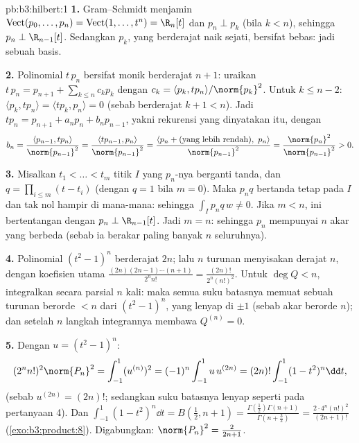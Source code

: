 \begin{solution}{pb:b3:hilbert:1}
\textbf{1.} Gram--Schmidt menjamin
$\operatorname{Vect}(p_0, \dots, p_n) =
\operatorname{Vect}(1, \dots, t^n) = \R_n[t]$ dan $p_n \perp
p_k$ (bila $k < n$), sehingga $p_n \perp \R_{n-1}[t]$. Sedangkan $p_k$, yang
berderajat naik sejati, bersifat bebas: jadi sebuah basis.

\textbf{2.} Polinomial $t\,p_n$ bersifat monik berderajat $n + 1$: uraikan
$t\,p_n = p_{n+1} + \sum_{k\leq n}c_kp_k$ dengan $c_k =
\langle p_k, tp_n\rangle/\norm{p_k}^2$. Untuk $k \leq n - 2$:
$\langle p_k, tp_n\rangle = \langle tp_k, p_n\rangle = 0$
(sebab berderajat $k + 1 < n$). Jadi $tp_n = p_{n+1} + a_np_n +
b_np_{n-1}$, yakni rekurensi yang dinyatakan itu, dengan
\[
b_n = \frac{\langle p_{n-1}, tp_n\rangle}{\norm{p_{n-1}}^2}
= \frac{\langle tp_{n-1}, p_n\rangle}{\norm{p_{n-1}}^2}
= \frac{\langle p_n + (\text{yang lebih rendah}),\
p_n\rangle}{\norm{p_{n-1}}^2}
= \frac{\norm{p_n}^2}{\norm{p_{n-1}}^2} > 0 .
\]

\textbf{3.} Misalkan $t_1 < \dots < t_m$ titik 
$I$ yang $p_n$-nya berganti tanda, dan $q = \prod_{i\leq m}(t -
t_i)$ (dengan $q = 1$ bila $m = 0$). Maka $p_nq$ bertanda tetap
pada $I$ dan tak nol hampir di mana-mana: sehingga $\int_Ip_nq\,w \neq 0$. Jika $m <
n$, ini bertentangan dengan $p_n \perp \R_{n-1}[t]$. Jadi $m = n$:
sehingga $p_n$ mempunyai $n$ akar  yang berbeda (sebab ia berakar paling banyak $n$
seluruhnya).

\textbf{4.} Polinomial $(t^2 - 1)^n$ berderajat $2n$; lalu $n$ turunan
menyisakan derajat $n$, dengan koefisien utama
$\frac{(2n)(2n-1)\cdots(n+1)}{2^nn!} =
\frac{(2n)!}{2^n(n!)^2}$. Untuk $\deg Q < n$, integralkan secara parsial
$n$ kali: maka semua suku batasnya memuat sebuah turunan berorde
$< n$ dari $(t^2-1)^n$, yang lenyap di $\pm1$ (sebab akar berorde
$n$); dan setelah $n$ langkah integrannya membawa $Q^{(n)} = 0$.

\textbf{5.} Dengan $u = (t^2 - 1)^n$:
\[
(2^nn!)^2\norm{P_n}^2 = \int_{-1}^1(u^{(n)})^2
= (-1)^n\int_{-1}^1 u\,u^{(2n)}
= (2n)!\int_{-1}^1(1 - t^2)^n\dd t ,
\]
(sebab $u^{(2n)} = (2n)!$; sedangkan suku batasnya lenyap seperti pada pertanyaan 4).
Dan $\int_{-1}^1(1-t^2)^n\dd t = B(\tfrac12, n+1) =
\frac{\Gamma(\frac12)\Gamma(n+1)}{\Gamma(n + \frac32)} =
\frac{2\cdot4^n(n!)^2}{(2n+1)!}$
(\cref{exo:b3:product:8}). Digabungkan: $\norm{P_n}^2 =
\frac{2}{2n + 1}$.


\end{solution}
